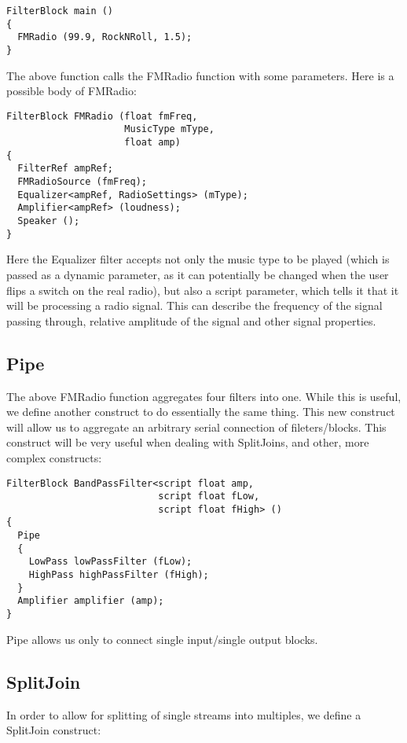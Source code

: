 \documentclass[twocolumn, draft]{article}
\begin{document}
\begin{verbatim}
FilterBlock main ()
{
  FMRadio (99.9, RockNRoll, 1.5);
}
\end{verbatim}

The above function calls the FMRadio function with some parameters.
Here is a possible body of FMRadio:

\begin{verbatim}
FilterBlock FMRadio (float fmFreq,
                     MusicType mType,
                     float amp)
{
  FilterRef ampRef;
  FMRadioSource (fmFreq);
  Equalizer<ampRef, RadioSettings> (mType);
  Amplifier<ampRef> (loudness);
  Speaker ();
}
\end{verbatim}

Here the Equalizer filter accepts not only the music type to be played
(which is passed as a dynamic parameter, as it can potentially be
changed when the user flips a switch on the real radio), but also
a script parameter, which tells it that it will be processing a radio
signal.  This can describe the frequency of the signal passing through,
relative amplitude of the signal and other signal properties.

\subsection{Pipe}

The above FMRadio function aggregates four filters into one.  While this is
useful, we define another construct to do essentially the same thing.
This new construct will
allow us to aggregate an arbitrary serial connection of fileters/blocks.
This construct will be very useful when dealing with SplitJoins, 
and other, more complex constructs:

\begin{verbatim}
FilterBlock BandPassFilter<script float amp, 
                           script float fLow, 
                           script float fHigh> ()
{
  Pipe
  {
    LowPass lowPassFilter (fLow);
    HighPass highPassFilter (fHigh);
  } 
  Amplifier amplifier (amp);
}
\end{verbatim}

Pipe allows us only to connect single input/single output blocks.

\subsection{SplitJoin}

In order to allow for splitting of single streams into multiples,
we define a SplitJoin construct:
\end{document}

